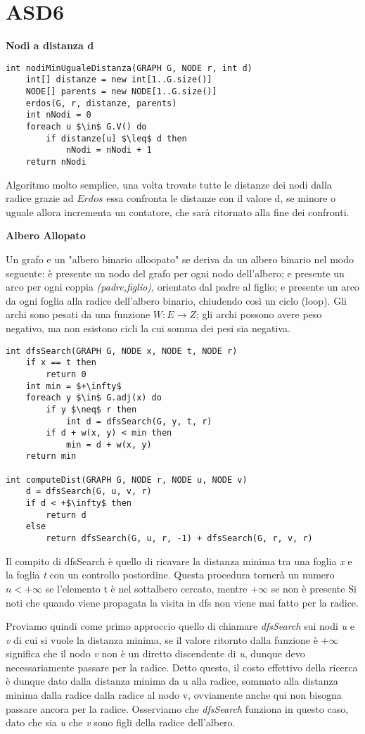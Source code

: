 \documentclass[../cheatSheetAlgoritmi.tex]{subfiles}
\begin{document}
\section{ASD6}
\textbf{Nodi a distanza d}
\begin{lstlisting}[caption= Nodi che distano un numero di archi $\leq$ d]
int nodiMinUgualeDistanza(GRAPH G, NODE r, int d)
	int[] distanze = new int[1..G.size()]
  	NODE[] parents = new NODE[1..G.size()]
  	erdos(G, r, distanze, parents)
  	int nNodi = 0
  	foreach u $\in$ G.V() do
    	if distanze[u] $\leq$ d then 
      		nNodi = nNodi + 1 
  	return nNodi
\end{lstlisting}
Algoritmo molto semplice, una volta trovate tutte le distanze dei nodi dalla radice grazie ad $Erdos$ essa confronta le distanze con il valore d, se minore o uguale allora incrementa un contatore, che sarà ritornato alla fine dei confronti.

\bigskip

\textbf{Albero Allopato}

Un grafo e un "albero binario alloopato" se
deriva da un albero binario nel modo seguente: è presente un nodo del
grafo per ogni nodo dell’albero; e presente un arco per ogni coppia
\textit{(padre,figlio)}, orientato dal padre al figlio; e presente un arco da ogni
foglia alla radice dell’albero binario, chiudendo così un ciclo (loop). Gli
archi sono pesati da una funzione $W : E\rightarrow Z$; gli archi possono avere
peso negativo, ma non esistono cicli la cui somma dei pesi sia negativa.
\begin{lstlisting}[caption= Albero Binario Allopato]
int dfsSearch(GRAPH G, NODE x, NODE t, NODE r)
	if x == t then
    	return 0
  	int min = $+\infty$ 
  	foreach y $\in$ G.adj(x) do
    	if y $\neq$ r then
      		int d = dfsSearch(G, y, t, r)
      	if d + w(x, y) < min then
        	min = d + w(x, y)
  	return min
 
int computeDist(GRAPH G, NODE r, NODE u, NODE v)
	d = dfsSearch(G, u, v, r)
  	if d < +$\infty$ then
    	return d
  	else
  		return dfsSearch(G, u, r, -1) + dfsSearch(G, r, v, r)
\end{lstlisting}
Il compito di dfsSearch è quello di ricavare la distanza minima tra una foglia \textit{x} e la foglia \textit{t} con un controllo postordine.
Questa procedura tornerà un numero $n < +\infty$ se l'elemento t è nel sottalbero cercato, mentre $+\infty$ se non è presente
Si noti che quando viene propagata la visita in dfs non viene mai fatto per la radice. 

Proviamo quindi come primo approccio quello di chiamare \textit{dfsSearch} sui nodi \textit{u} e \textit{v} di cui si vuole la distanza minima, se il valore ritornto dalla funzione è $+\infty$ significa che il nodo \textit{v} non è un diretto discendente di \textit{u}, dunque devo necessariamente passare per la radice.
Detto questo, il costo effettivo della ricerca è dunque dato dalla distanza minima da u alla radice, sommato alla distanza minima dalla radice dalla radice al nodo v, ovviamente anche qui non bisogna passare ancora per la radice. Osserviamo che \textit{dfsSearch} funziona in questo caso, dato che sia \textit{u} che \textit{v} sono figli della radice dell'albero.
\end{document}
